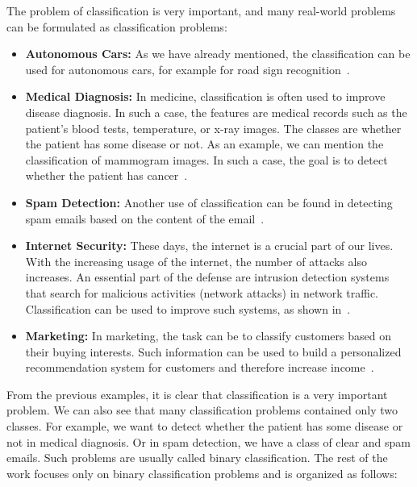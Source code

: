 The problem of classification is very important, and many real-world problems can be formulated as classification problems:
\begin{itemize}
  \item \textbf{Autonomous Cars:} As we have already mentioned, the classification can be used for autonomous cars, for example for road sign recognition~\cite{swaminathan2019autonomous}.
  \item \textbf{Medical Diagnosis:} In medicine, classification is often used to improve disease diagnosis. In such a case, the features are medical records such as the patient's blood tests, temperature, or x-ray images. The classes are whether the patient has some disease or not. As an example, we can mention the classification of mammogram images. In such a case, the goal is to detect whether the patient has cancer~\cite{viale2012current, levy2016breast}.
  \item \textbf{Spam Detection:} Another use of classification can be found in detecting spam emails based on the content of the email~\cite{pantel1998spamcop}.
  \item \textbf{Internet Security:} These days, the internet is a crucial part of our lives. With the increasing usage of the internet, the number of attacks also increases. An essential part of the defense are intrusion detection systems~\cite{grill2016learning, scarfone2007guide} that search for malicious activities (network attacks) in network traffic. Classification can be used to improve such systems, as shown in~\cite{giacinto2002intrusion, shanbhag2009accurate}.
  \item \textbf{Marketing:} In marketing, the task can be to classify customers based on their buying interests. Such information can be used to build a personalized recommendation system for customers and therefore increase income~\cite{kaefer2005neural, zhang2007building}.
\end{itemize}
From the previous examples, it is clear that classification is a very important problem. We can also see that many classification problems contained only two classes. For example, we want to detect whether the patient has some disease or not in medical diagnosis. Or in spam detection, we have a class of clear and spam emails. Such problems are usually called binary classification. The rest of the work focuses only on binary classification problems and is organized as follows:
